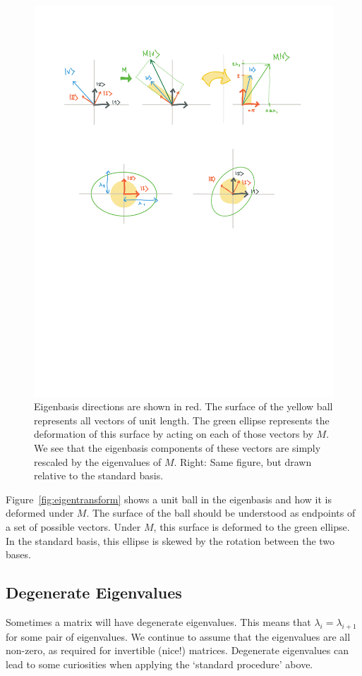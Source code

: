 \documentclass[12pt]{article}
\begin{document}
\begin{figure}[tb]
    \centering
    \includegraphics[width=.6\textwidth]{figures/eigen_ball.pdf}
    \caption{Eigenbasis directions are shown in red. The surface of the yellow ball represents all vectors of unit length. The green ellipse represents the deformation of this surface by acting on each of those vectors by $M$. We see that the eigenbasis components of these vectors are simply rescaled by the eigenvalues of $M$. Right: Same figure, but drawn relative to the standard basis.}
    \label{fig:eigenbal}
\end{figure}

Figure~\ref{fig:eigentransform} shows a unit ball in the eigenbasis and how it is deformed under $M$. The surface of the ball should be understood as endpoints of a set of possible vectors. Under $M$, this surface is deformed to the green ellipse. In the standard basis, this ellipse is skewed by the rotation between the two bases. 






\subsection{Degenerate Eigenvalues}

Sometimes a matrix will have degenerate eigenvalues. This means that $\lambda_i = \lambda_{i+1}$ for some pair of eigenvalues. We continue to assume that the eigenvalues are all non-zero, as required for invertible (nice!) matrices.  Degenerate eigenvalues can lead to some curiosities when applying the `standard procedure' above. 
\end{document}
